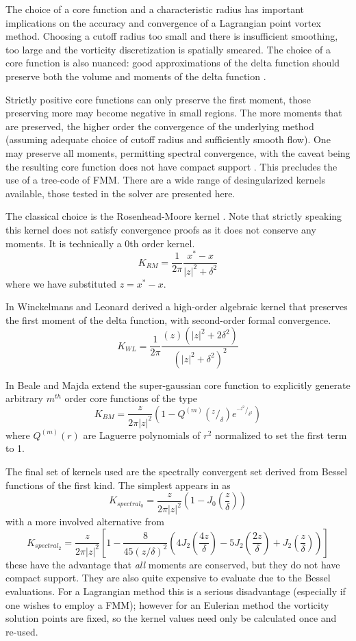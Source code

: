 \documentclass[letterpaper,12pt]{report}
\newcommand{\ben}[1]{\begin{equation}\label{#1}}
\newcommand{\ee}{\end{equation}}
\begin{document}
The choice of a core function and a characteristic radius has important implications on the accuracy and convergence of a Lagrangian point vortex method. Choosing a cutoff radius too small and there is insufficient smoothing, too large and the vorticity discretization is spatially smeared. The choice of a core function is also nuanced: good approximations of the delta function should preserve both the volume and moments of the delta function \cite{BealeMajda}.

Strictly positive core functions can only preserve the first moment, those preserving more may become negative in small regions. The more moments that are preserved, the higher order the convergence of the underlying method (assuming adequate choice of cutoff radius and sufficiently smooth flow). One may preserve all moments, permitting spectral convergence, with the caveat being the resulting core function does not have compact support \cite{Hald3}. This precludes the use of a tree-code of FMM. There are a wide range of desingularized kernels available, those tested in the solver are presented here.

The classical choice is the Rosenhead-Moore kernel \cite{Rosenhead1930,Moore1972}. Note that strictly speaking this kernel does not satisfy convergence proofs as it does not conserve any moments. It is technically a 0th order kernel.
\ben{RMkern} K_{RM} = \frac{1}{2 \pi} \frac{x^*-x}{|z|^2+\delta^2} \ee
where we have substituted $z=x^*-x$.

In \cite{WL} Winckelmans and Leonard derived a high-order algebraic kernel that preserves the first moment of the delta function, with second-order formal convergence.
\ben{WLkern} K_{WL}=\frac{1}{2 \pi} \frac{(z)(|z|^2+2\delta^2)}{(|z|^2+\delta^2)^2} \ee

In \cite{BealeMajda} Beale and Majda extend the super-gaussian core function to explicitly generate arbitrary $m^{th}$ order core functions of the type
\ben{SGkern} K_{BM}= \frac{z}{2 \pi |z|^2} (1-Q^{(m)}(^z\!/_{\delta})e^{^{-z^2}\!/_{\delta^2}} )\ee
where $Q^{(m)}(r)$ are Laguerre polynomials of $r^2$ normalized to set the first term to 1.

The final set of kernels used are the spectrally convergent set derived from Bessel functions of the first kind. The simplest appears in \cite{WL} as
\ben{PSkern}  K_{spectral_0}= \frac{z}{2 \pi |z|^2} (1-J_0(\frac{z}{\delta})) \ee
with a more involved alternative from \cite{HaldReview}
\ben{PSkern}  K_{spectral_2}= \frac{z}{2 \pi |z|^2} \left[1-\frac{8}{45(z/\delta)^2}(4J_2(\frac{4z}{\delta})-5J_2(\frac{2z}{\delta})+J_2(\frac{z}{\delta}))\right] \ee
these have the advantage that \textit{all} moments are conserved, but they do not have compact support. They are also quite expensive to evaluate due to the Bessel evaluations. For a Lagrangian method this is a serious disadvantage (especially if one wishes to employ a FMM); however for an Eulerian method the vorticity solution points are fixed, so the kernel values need only be calculated once and re-used.
\end{document}
